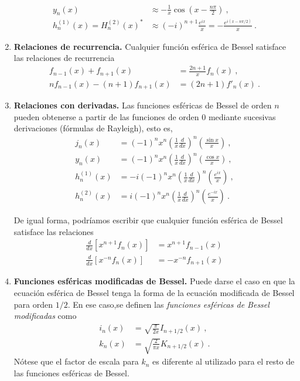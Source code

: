 \begin{propiedad}
\begin{enumerate}
\begin{align}
            y_n(x) & \approx - \frac{1}{x} \cos\left( x - \frac{n\pi}{2} \right) \ , \\
            h_n^{(1)}(x) = H_n^{(2)}(x)^\ast & \approx (-i)^{n+1} \frac{e^{ix}}{x} = - \frac{e^{i(x-n\pi/2)}}{x} \ .
        \end{align}
        \item \textbf{Relaciones de recurrencia.} Cualquier función esférica de Bessel satisface las relaciones de recurrencia
        \begin{align}
            f_{n-1}(x) + f_{n+1}(x) & = \frac{2n+1}{x} f_n(x) \ , \\
            n f_{n-1}(x) - (n+1) f_{n+1}(x) & = (2n+1) f'_n(x) \ .
        \end{align}
        \item \textbf{Relaciones con derivadas.} Las funciones esféricas de Bessel de orden $n$ pueden obtenerse a partir de las funciones de orden 0 mediante sucesivas derivaciones (fórmulas de Rayleigh), esto es,
        \begin{align}
            j_n(x) & = (-1)^n x^n \left( \frac{1}{x} \frac{d}{dx} \right)^n \left( \frac{\sin x}{x} \right) \ , \\
            y_n(x) & = (-1)^n x^n \left( \frac{1}{x} \frac{d}{dx} \right)^n \left( \frac{\cos x}{x} \right) \ , \\
            h_n^{(1)}(x) & = -i (-1)^n x^n \left( \frac{1}{x} \frac{d}{dx} \right)^n \left( \frac{e^{ix}}{x} \right) \ , \\
            h_n^{(2)}(x) & = i (-1)^n x^n \left( \frac{1}{x} \frac{d}{dx} \right)^n \left( \frac{e^{-ix}}{x} \right) \ .
        \end{align}

        De igual forma, podríamos escribir que cualquier función esférica de Bessel satisface las relaciones
        \begin{align}
            \frac{d}{dx}[x^{n+1} f_n(x)] & = x^{n+1} f_{n-1}(x) \\
            \frac{d}{dx}[x^{-n} f_n(x)] & = -x^{-n} f_{n+1}(x)
        \end{align}
        
        
        \item \textbf{Funciones esféricas modificadas de Bessel.} Puede darse el caso en que la ecuación esférica de Bessel tenga la forma de la ecuación modificada de Bessel para orden $1/2$. En ese caso,se definen las \emph{funciones esféricas de Bessel modificadas} como
        \begin{align}
            i_n(x) & = \sqrt{\frac{\pi}{2x}} I_{n+1/2}(x) \ , \\
            k_n(x) & = \sqrt{\frac{2}{\pi x}} K_{n+1/2}(x) \ .
        \end{align} 
        Nótese que el factor de escala para $k_n$ es diferente al utilizado para el resto de las funciones esféricas de Bessel.

    \end{enumerate}
\end{propiedad}
